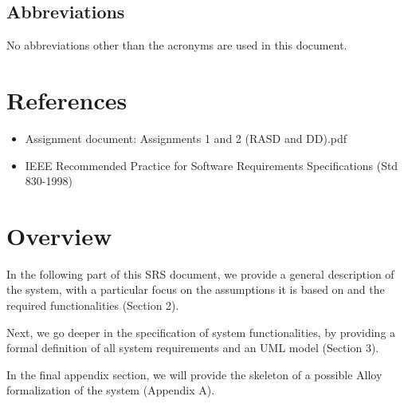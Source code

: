 \subsection{Abbreviations}
No abbreviations other than the acronyms are used in this document.


\section{References}
\begin{itemize}
\item Assignment document: Assignments 1 and 2 (RASD and DD).pdf
\item IEEE Recommended Practice for Software Requirements Specifications (Std 830-1998)
\end{itemize}


\section{Overview}
In the following part of this SRS document, we provide a general description of the system, with a particular focus on the assumptions it is based on and the required functionalities (Section 2).

Next, we go deeper in the specification of system functionalities, by providing a formal definition of all system requirements and an UML model (Section 3).

In the final appendix section, we will provide the skeleton of a possible Alloy formalization of the system (Appendix A). 

